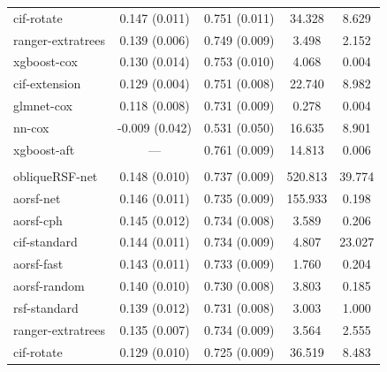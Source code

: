 \documentclass[twoside,11pt]{article}\usepackage[]{graphicx}\usepackage[]{xcolor}
\newenvironment{knitrout}{}{} %
\begin{document}
\begin{knitrout}
\begin{longtable}[t]{lcccc}
\hspace{1em}cif-rotate & 0.147 (0.011) & 0.751 (0.011) & 34.328 & 8.629\\
\hspace{1em}ranger-extratrees & 0.139 (0.006) & 0.749 (0.009) & 3.498 & 2.152\\
\hspace{1em}xgboost-cox & 0.130 (0.014) & 0.753 (0.010) & 4.068 & 0.004\\
\hspace{1em}cif-extension & 0.129 (0.004) & 0.751 (0.008) & 22.740 & 8.982\\
\hspace{1em}glmnet-cox & 0.118 (0.008) & 0.731 (0.009) & 0.278 & 0.004\\
\hspace{1em}nn-cox & -0.009 (0.042) & 0.531 (0.050) & 16.635 & 8.901\\
\hspace{1em}xgboost-aft & --- & 0.761 (0.009) & 14.813 & 0.006\\
\addlinespace[0.3em]
\multicolumn{5}{l}{\textit{\textbf{Rotterdam tumor bank; recurrence, n = 2982, p = 11}}}\\
\hline
\hspace{1em}obliqueRSF-net & 0.148 (0.010) & 0.737 (0.009) & 520.813 & 39.774\\
\hspace{1em}aorsf-net & 0.146 (0.011) & 0.735 (0.009) & 155.933 & 0.198\\
\hspace{1em}aorsf-cph & 0.145 (0.012) & 0.734 (0.008) & 3.589 & 0.206\\
\hspace{1em}cif-standard & 0.144 (0.011) & 0.734 (0.009) & 4.807 & 23.027\\
\hspace{1em}aorsf-fast & 0.143 (0.011) & 0.733 (0.009) & 1.760 & 0.204\\
\hspace{1em}aorsf-random & 0.140 (0.010) & 0.730 (0.008) & 3.803 & 0.185\\
\hspace{1em}rsf-standard & 0.139 (0.012) & 0.731 (0.008) & 3.003 & 1.000\\
\hspace{1em}ranger-extratrees & 0.135 (0.007) & 0.734 (0.009) & 3.564 & 2.555\\
\hspace{1em}cif-rotate & 0.129 (0.010) & 0.725 (0.009) & 36.519 & 8.483\\

\end{longtable}
\end{knitrout}
\end{document}
